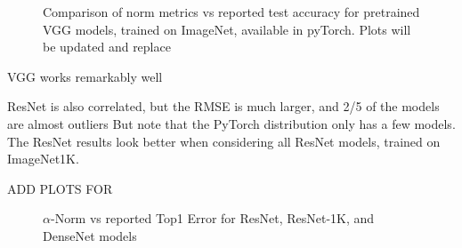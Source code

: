 \begin{figure}[t]
{        \label{fig:vgg-pnorm}
    }
    \caption{Comparison of norm metrics vs reported test accuracy for pretrained VGG models, trained on ImageNet, available in pyTorch.  Plots will be updated and replace }
    

    \label{fig:vgg-metrics}
\end{figure}


VGG works remarkably well

ResNet is also correlated, but the RMSE is much larger, and 2/5 of the models are almost outliers
But note that the PyTorch distribution only has a few models.
The ResNet results look better when considering all ResNet models, trained on ImageNet1K.

ADD PLOTS FOR


\begin{figure}[t]
    \centering

    \qquad
    \qquad
    \caption{$\alpha$-Norm vs reported Top1 Error for  ResNet, ResNet-1K, and DenseNet models}
    \label{fig:cv2-accuracy}
\end{figure}


